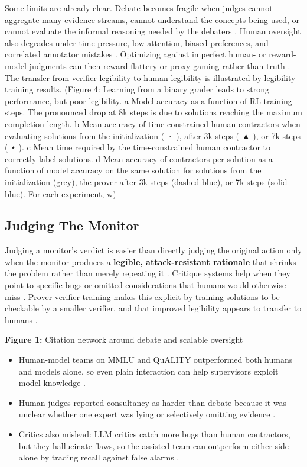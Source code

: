 Some limits are already clear. Debate becomes fragile when judges cannot aggregate many evidence streams, cannot understand the concepts being used, or cannot evaluate the informal reasoning needed by the debaters  \cite{Irving2018AI}. Human oversight also degrades under time pressure, low attention, biased preferences, and correlated annotator mistakes  \cite{Casper2023Open}. Optimizing against imperfect human- or reward-model judgments can then reward flattery or proxy gaming rather than truth  \cite{Sharma2023Towards} \cite{Gao2022Scaling}. The transfer from verifier legibility to human legibility is illustrated by legibility-training results. (Figure 4: Learning from a binary grader leads to strong performance, but poor legibility. a Model accuracy as a function of RL training steps. The pronounced drop at 8k steps is due to solutions reaching the maximum completion length. b Mean accuracy of time-constrained human contractors when evaluating solutions from the initialization ( · ), after 3k steps ( ▲ ), or 7k steps ( ⋆ ). c Mean time required by the time-constrained human contractor to correctly label solutions. d Mean accuracy of contractors per solution as a function of model accuracy on the same solution for solutions from the initialization (grey), the prover after 3k steps (dashed blue), or 7k steps (solid blue). For each experiment, w)


\subsection*{Judging The Monitor}


Judging a monitor’s verdict is easier than directly judging the original action only when the monitor produces a \textbf{legible, attack-resistant rationale} that shrinks the problem rather than merely repeating it  \cite{McAleese2024LLM} \cite{Recchia2025FindTheFlaws:}. Critique systems help when they point to specific bugs or omitted considerations that humans would otherwise miss  \cite{Saunders2022Self-critiquing} \cite{McAleese2024LLM}. Prover-verifier training makes this explicit by training solutions to be checkable by a smaller verifier, and that improved legibility appears to transfer to humans  \cite{Kirchner2024Prover-Verifier}.


\textbf{Figure 1:} Citation network around debate and scalable oversight


\begin{itemize}
\item Human-model teams on MMLU and QuALITY outperformed both humans and models alone, so even plain interaction can help supervisors exploit model knowledge  \cite{Bowman2022Measuring} \cite{Recchia2025FindTheFlaws:}.
\item Human judges reported consultancy as harder than debate because it was unclear whether one expert was lying or selectively omitting evidence  \cite{Michael2023Debate}.
\item Critics also mislead: LLM critics catch more bugs than human contractors, but they hallucinate flaws, so the assisted team can outperform either side alone by trading recall against false alarms  \cite{McAleese2024LLM}.
\end{itemize}


